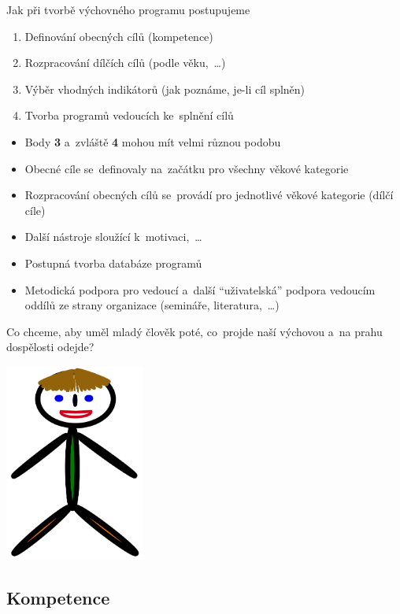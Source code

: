 \documentclass[compress, ucs, xelatex, 11pt, xcolor=dvipsnames, print,
	hyperref={
		bookmarks=true,
		unicode=true,
		colorlinks=true,
		pdftitle={Skautska vychovna metoda},
		plainpages=false,
		pdfauthor={Vojtech Zeisek},
		pdfsubject={Skautska vychovna metoda a jeji vyvoj za posledni stoleti a desetileti},
		pdfcreator={XeLaTeX},
		pdfkeywords={Junak, Pedagogika, Skaut, Skauting, Vychovna metoda},
		linkcolor=Black,
		anchorcolor=Black,
		citecolor=OliveGreen,
		filecolor=OliveGreen,
		menucolor=Black,
		urlcolor=OliveGreen,
		pdftex},
	url={hyphens, lowtilde} %
	]{beamer}
\begin{document}
\begin{frame}{Jak při tvorbě výchovného programu postupujeme}
	\begin{enumerate}
		\item Definování obecných cílů (kompetence)
		\item Rozpracování dílčích cílů (podle věku,~\ldots)
		\item Výběr vhodných indikátorů (jak poznáme, je-li cíl splněn)
		\item Tvorba programů vedoucích ke~splnění cílů
	\end{enumerate}
	\begin{itemize}
		\item Body \textbf{3} a~zvláště \textbf{4} mohou mít velmi různou podobu
		\item Obecné cíle se~definovaly na~začátku pro všechny věkové kategorie
		\item Rozpracování obecných cílů se~provádí pro jednotlivé věkové kategorie (dílčí cíle)
		\item Další nástroje sloužící k~motivaci,~\ldots
		\item Postupná tvorba databáze programů
		\item Metodická podpora pro vedoucí a~další \enquote{uživatelská} podpora vedoucím oddílů ze strany organizace (semináře, literatura,~\ldots)
	\end{itemize}
\end{frame}

\begin{frame}{Co chceme, aby uměl mladý člověk poté, co~projde naší výchovou a~na prahu dospělosti odejde?}
	\begin{center}
		\includegraphics[height=6.5cm]{pepicek.png}
	\end{center}
\end{frame}

\subsection{Kompetence}
\end{document}
